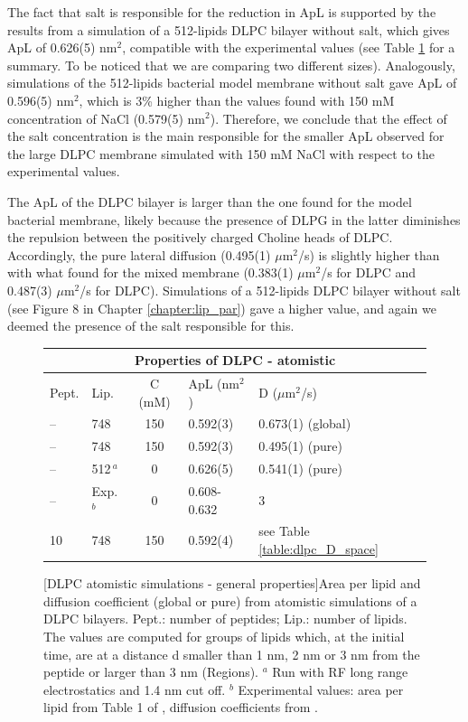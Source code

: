The fact that salt is responsible for the reduction in ApL is supported by the results from a simulation of a 512-lipids DLPC bilayer without salt, which gives ApL of 0.626(5) nm$^2$, compatible with the experimental values (see Table \ref{table:dlpc_apl} for a summary. To be noticed that we are comparing two different sizes). Analogously, simulations of the 512-lipids bacterial model membrane without salt gave ApL of 0.596(5) nm$^2$, which is 3\% higher than the values found with 150 mM concentration of NaCl (0.579(5) nm$^2$).
%
Therefore, we conclude that the effect of the salt concentration is the main responsible for the smaller ApL observed for the large DLPC membrane simulated with 150 mM NaCl with respect to the experimental values.

The ApL of the DLPC bilayer is larger than the one found for the model bacterial membrane, likely because the presence of DLPG in the latter diminishes the repulsion between the positively charged Choline heads of DLPC. Accordingly, the pure lateral diffusion (0.495(1) $\mu$m$^2$/s) is slightly higher than with what found for the mixed membrane (0.383(1) $\mu$m$^2$/s for DLPC and 0.487(3) $\mu$m$^2$/s for DLPC). Simulations of a 512-lipids DLPC bilayer without salt (see Figure 8 in Chapter \ref{chapter:lip_par}) gave a higher value, and again we deemed the presence of the salt responsible for this.

\begin{figure}[t!]
\centering
 \def\arraystretch{1.6}
\begin{tabular}{llcll}
\multicolumn{5}{c}{\textbf{Properties of DLPC - atomistic}} \\
\hline
Pept. & Lip. & C (mM) & ApL (nm$^2$) & D ($\mu$m$^2$/s) \\
\hline
-- & 748 & 150 & 0.592(3) & 0.673(1) (global) \\
-- & 748 & 150 & 0.592(3) & 0.495(1) (pure) \\
-- & 512$\,^a$ & 0 & 0.626(5) & 0.541(1) (pure) \\
\cline{2-5}
-- & Exp.$^b$ & 0 & 0.608-0.632 & 3 \\
\hline
10 & 748 & 150 & 0.592(4) & see Table \ref{table:dlpc_D_space} \\
\hline
 \end{tabular}
[DLPC atomistic simulations - general properties]{Area per lipid and diffusion coefficient (global or pure) from atomistic simulations of a DLPC bilayers. Pept.: number of peptides; Lip.: number of lipids. The values are computed for groups
of lipids which, at the initial time, are at a distance d smaller than 1 nm, 2 nm or
3 nm from the peptide or larger than 3 nm (Regions). $^a$ Run with RF long range electrostatics and 1.4 nm cut off. $^b$ Experimental values: area per lipid from Table 1 of \citet{Poger2016}, diffusion coefficients from \citet{Lindblom2009}.}
\label{table:dlpc_apl}
\end{figure}

